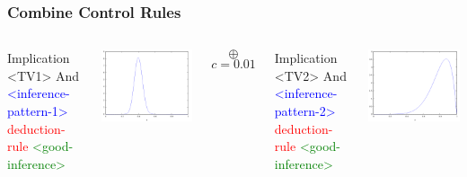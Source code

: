 \documentclass{beamer}
\begin{document}
\begin{frame}[fragile]
  \frametitle{Combine Control Rules}

\begin{columns}

\column{1.1in}

{\tiny
\begin{semiverbatim}
Implication <TV1>
  And
    \textcolor{blue}{<inference-pattern-1>}
    \textcolor{red}{deduction-rule}
  \textcolor{green}{<good-inference>}
\end{semiverbatim}
}

\includegraphics[scale=0.2]{images/Beta_40_60_alpha.png}

\column{0.4in}
\begin{center}
  $$\oplus$$
  {\tiny $$c=0.01$$}
\end{center}

\column{1.3in}

{\tiny
\begin{semiverbatim}
Implication <TV2>
  And
    \textcolor{blue}{<inference-pattern-2>}
    \textcolor{red}{deduction-rule}
  \textcolor{green}{<good-inference>}
\end{semiverbatim}
}

\includegraphics[scale=0.2]{images/Beta_8_2_alpha.png}


\end{columns}
\end{frame}
\end{document}
